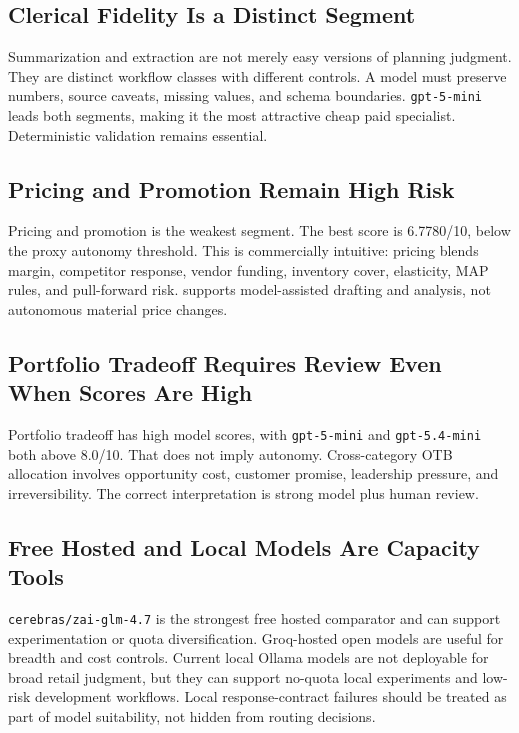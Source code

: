 \documentclass[11pt]{article}
\newcommand{\score}[1]{#1/10}
\newcommand{\code}[1]{\texttt{#1}}
\begin{document}
\subsection{Clerical Fidelity Is a Distinct Segment}

Summarization and extraction are not merely easy versions of planning judgment. They are distinct workflow classes with different controls. A model must preserve numbers, source caveats, missing values, and schema boundaries. \code{gpt-5-mini} leads both segments, making it the most attractive cheap paid specialist. Deterministic validation remains essential.

\subsection{Pricing and Promotion Remain High Risk}

Pricing and promotion is the weakest segment. The best score is \score{6.7780}, below the proxy autonomy threshold. This is commercially intuitive: pricing blends margin, competitor response, vendor funding, inventory cover, elasticity, MAP rules, and pull-forward risk. supports model-assisted drafting and analysis, not autonomous material price changes.

\subsection{Portfolio Tradeoff Requires Review Even When Scores Are High}

Portfolio tradeoff has high model scores, with \code{gpt-5-mini} and \code{gpt-5.4-mini} both above \score{8.0}. That does not imply autonomy. Cross-category OTB allocation involves opportunity cost, customer promise, leadership pressure, and irreversibility. The correct interpretation is strong model plus human review.

\subsection{Free Hosted and Local Models Are Capacity Tools}

\code{cerebras/zai-glm-4.7} is the strongest free hosted comparator and can support experimentation or quota diversification. Groq-hosted open models are useful for breadth and cost controls. Current local Ollama models are not deployable for broad retail judgment, but they can support no-quota local experiments and low-risk development workflows. Local response-contract failures should be treated as part of model suitability, not hidden from routing decisions.
\end{document}
